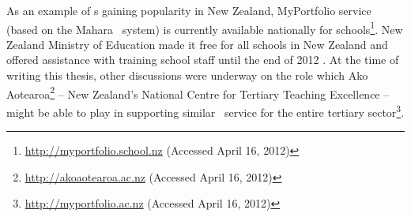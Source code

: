 As an example of \ep s gaining popularity in New Zealand, MyPortfolio service
(based on the Mahara \ep~system) is currently available nationally for
schools\footnote{\url{http://myportfolio.school.nz} (Accessed April 16, 2012)}.
New Zealand Ministry of Education made it free for all schools in New Zealand and offered assistance
with training school staff until the end of 2012
\citep{NewZealandMinistryofEducation2012}. At the time of writing this thesis,
other discussions were underway on the role which Ako
Aotearoa\footnote{\url{http://akoaotearoa.ac.nz} (Accessed April 16, 2012)} --
New Zealand's National Centre for Tertiary Teaching Excellence -- might be able to play in supporting
similar \ep~service for the entire tertiary
sector\footnote{\url{http://myportfolio.ac.nz} (Accessed April 16, 2012)}.
